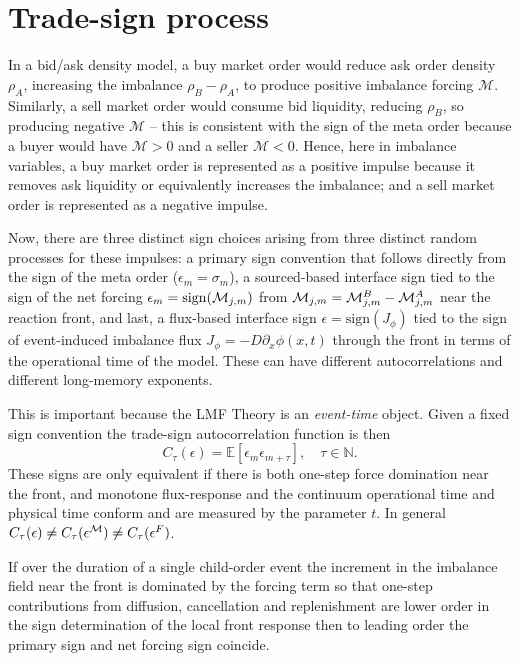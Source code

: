 \documentclass[5p,final]{elsarticle}
\newcommand{\E}{\mathbb{E}}
\newcommand{\N}{\mathbb{N}}
\newcommand{\sign}{\mathrm{sign}}
\begin{document}
\section{Trade-sign process} \label{sec:tradesign}

In a bid/ask density model, a buy market order would reduce ask order density $\rho_A$, increasing the imbalance $\rho_B-\rho_A$, to produce positive imbalance forcing $\mathcal M$. Similarly, a sell market order would consume bid liquidity, reducing $\rho_B$, so producing negative $\mathcal M$ -- this is consistent with the sign of the meta order because a buyer would have $\mathcal M >0$ and a seller $\mathcal M<0$. Hence, here in imbalance variables, a buy market order is represented as a positive impulse because it removes ask liquidity or equivalently increases the imbalance; and a sell market order is represented as a negative impulse.

Now, there are three distinct sign choices arising from three distinct random processes for these impulses: a primary sign convention that follows directly from the sign of the meta order ($\epsilon_m=\sigma_m$), a sourced-based interface sign tied to the sign of the net forcing $\epsilon_m = \sign({\cal M}_{j,m})$ from ${\cal M}_{j,m} = {\cal M}_{j,m}^B - {\cal M}_{j,m}^A$ near the reaction front, and last, a flux-based interface sign $\epsilon = \sign(J_{\phi})$ tied to the sign of event-induced imbalance flux $J_{\phi} = - D \partial_x \phi(x,t)$ through the front in terms of the operational time of the model. These can have different autocorrelations and different long-memory exponents. 

This is important because the LMF Theory is an {\it event-time} object.  Given a fixed sign convention the trade-sign autocorrelation function is then 
\begin{equation}
    C_{\tau}(\epsilon) = \E [\epsilon_m \epsilon_{m+\tau}], \quad \tau \in \N.
\end{equation}
These signs are only equivalent if there is both one-step force domination near the front, and monotone flux-response and the continuum operational time and physical time conform and are measured by the parameter $t$. In general $C_{\tau}(\epsilon) \neq C_{\tau}(\epsilon^{\cal M}) \neq C_{\tau}(\epsilon^F)$. 

If over the duration of a single child-order event the increment in the imbalance field near the front is dominated by the forcing term so that one-step contributions from diffusion, cancellation and replenishment are lower order in the sign determination of the local front response then to leading order the primary sign and net forcing sign coincide.
\end{document}
